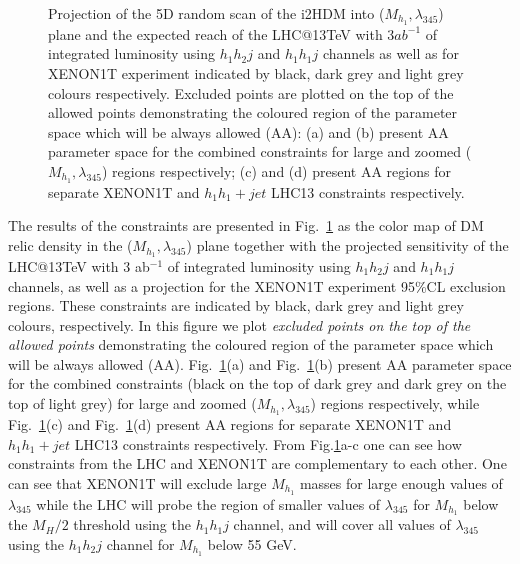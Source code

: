 \begin{figure}[htb]
\vskip -0.3cm
\caption{Projection of the 5D random scan of the i2HDM into ($M_{h_1},\lambda_{345}$)
plane and the expected  reach of the LHC@13TeV with 3$ab^{-1}$ of integrated luminosity 
using  $h_1 h_2 j$  and  $h_1 h_1 j$ channels as well as for XENON1T experiment
indicated by black,
dark grey and light grey colours respectively.
Excluded points are plotted on the top of the allowed points   demonstrating the coloured region of the parameter space which will be always allowed (AA):
(a) and (b)
present AA parameter space for the combined constraints for 
large and zoomed ($M_{h_1},\lambda_{345}$) regions respectively;
(c) and (d)
present AA regions for separate  XENON1T and $h_1h_1+jet$ LHC13 constraints
respectively.
\label{collider-XENON1T-constraint}} 
\end{figure}
%
The results of the constraints are presented in Fig.~\ref{collider-XENON1T-constraint} as the color map of DM relic density
in the ($M_{h_1},\lambda_{345}$)  plane together with the projected sensitivity of the LHC@13TeV with 3 ab$^{-1}$ of integrated luminosity 
using  $h_1 h_2 j$  and  $h_1 h_1 j$ channels, as well as a projection for the XENON1T experiment
95\%CL exclusion regions. These constraints are indicated by black, dark grey and light grey colours, respectively.
In this figure we plot {\it excluded points on the top of the allowed points}   demonstrating the coloured region of the parameter space which will be always allowed (AA).
Fig.~\ref{collider-XENON1T-constraint}(a) and Fig.~\ref{collider-XENON1T-constraint}(b)
present AA parameter space for the combined constraints (black on the top of dark grey and dark grey on the top of light grey) for 
large and zoomed ($M_{h_1},\lambda_{345}$) regions respectively,
while  Fig.~\ref{collider-XENON1T-constraint}(c) and  Fig.~\ref{collider-XENON1T-constraint}(d)
present AA regions for separate  XENON1T and $h_1h_1+jet$ LHC13 constraints
respectively. From Fig.\ref{collider-XENON1T-constraint}a-c 
one can see how constraints from the LHC and XENON1T are complementary to each other.
One can see that XENON1T will exclude large $M_{h_1}$ masses
for large enough values of  $\lambda_{345}$ while the LHC will probe the region of smaller values of  $\lambda_{345}$ for $M_{h_1}$ below the $M_H/2$ threshold using the
$h_1h_1j$ channel, and will cover all values of $\lambda_{345}$
using the $h_1h_2j$ channel for  $M_{h_1}$ below 55 GeV.

